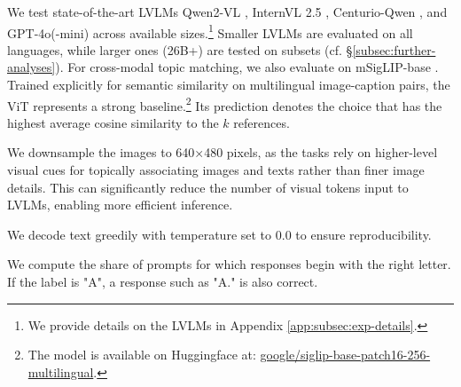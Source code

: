  We test state-of-the-art LVLMs Qwen2-VL \cite{wang2024qwen2vl}, InternVL 2.5 \cite{chen2024internvl}, Centurio-Qwen \cite{geigle2025centurio}, and GPT-4o(-mini) across available sizes.\footnote{We provide details on the LVLMs in Appendix \ref{app:subsec:exp-details}.} Smaller LVLMs are evaluated on all languages, while larger ones (26B+) are tested on subsets (cf. \S\ref{subsec:further-analyses}). For cross-modal topic matching, we also evaluate on mSigLIP-base \cite{zhai2023sigmoid}. Trained explicitly for semantic similarity on multilingual image-caption pairs, the ViT represents a strong baseline.\footnote{The model is available on Huggingface at: \href{https://huggingface.co/google/siglip-base-patch16-256-multilingual}{google/siglip-base-patch16-256-multilingual}.} Its prediction denotes the choice that has the highest average cosine similarity to the $k$ references.

 We downsample the images to 640×480 pixels, as the tasks rely on higher-level visual cues for topically associating images and texts rather than finer image details. This can significantly reduce the number of visual tokens input to LVLMs, enabling more efficient inference.

 We decode text greedily with temperature set to $0.0$ to ensure reproducibility.

 We compute the share of prompts for which responses begin with the right letter. If the label is "A", a response such as "A." is also correct.